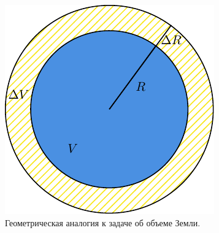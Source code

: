 \documentclass[a4paper,9pt,russian]{article}
\begin{document}
\begin{figure}[h]
 \centering
 \includegraphics[scale = 0.8]{first3.pdf}
 \caption{Геометрическая аналогия к задаче об объеме Земли.}
 \label{fig:4}
\end{figure}
\end{document}
